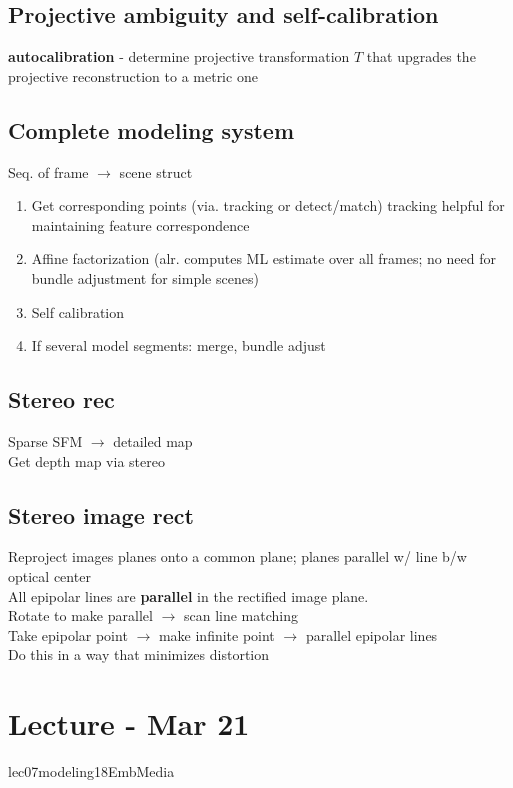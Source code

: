 \documentclass{article}
\begin{document}
\subsection{Projective ambiguity and self-calibration}
\textbf{autocalibration} - determine projective transformation $T$ that
upgrades the projective reconstruction to a metric one


\subsection{Complete modeling system}
Seq. of frame $\to$ scene struct
\begin{enumerate}
  \item Get corresponding points (via. tracking or detect/match)
    \subitem tracking helpful for maintaining feature correspondence
  
  \item Affine factorization (alr. computes ML estimate over all frames; no need for
  bundle adjustment for simple scenes)

  \item Self calibration
  
  \item If several model segments: merge, bundle adjust

\end{enumerate}

\subsection{Stereo rec}
Sparse SFM $\to$ detailed map
\\
Get depth map via stereo


\subsection{Stereo image rect}
Reproject images planes onto a common plane; planes parallel w/ line b/w optical center 
\\
All epipolar lines are \textbf{parallel} in the rectified image plane.
\\
Rotate to make parallel $\to$ scan line matching
\\[5pt]
Take epipolar point $\to$ make infinite point $\to$ parallel epipolar lines
\\
Do this in a way that minimizes distortion

\section{Lecture - Mar 21}
lec07modeling18EmbMedia
\end{document}

